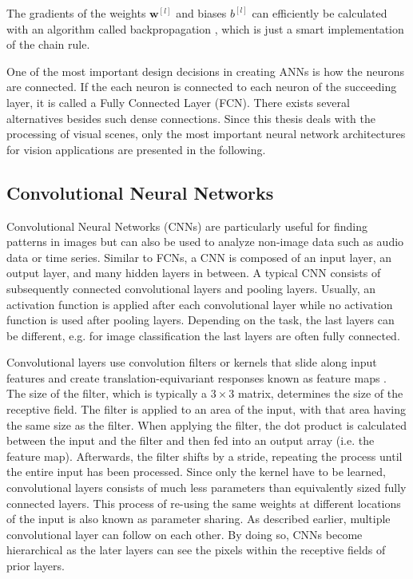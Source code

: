 The gradients of the weights \(\boldsymbol{w}^{[l]}\) and biases \(b^{[l]}\) can efficiently be calculated with an algorithm called backpropagation , which is just a smart implementation of the chain rule.

One of the most important design decisions in creating ANNs is how the neurons are connected.
If the each neuron is connected to each neuron of the succeeding layer, it is called a Fully Connected Layer (FCN). 
There exists several alternatives besides such dense connections.
Since this thesis deals with the processing of visual scenes, only the most important neural network architectures for vision applications are presented in the following.

\subsection{Convolutional Neural Networks}
Convolutional Neural Networks (CNNs) are particularly useful for finding patterns in images but can also be used to analyze non-image data such as audio data or time series.
Similar to FCNs, a CNN is composed of an input layer, an output layer, and many hidden layers in between.
A typical CNN consists of subsequently connected convolutional layers and pooling layers.
Usually, an activation function is applied after each convolutional layer while no activation function is used after pooling layers.
Depending on the task, the last layers can be different, e.g. for image classification the last layers are often fully connected.

Convolutional layers use convolution filters or kernels that slide along input features and create translation-equivariant responses known as feature maps .
The size of the filter, which is typically a \(3\times 3\) matrix, determines the size of the receptive field.
The filter is applied to an area of the input, with that area having the same size as the filter.
When applying the filter, the dot product is calculated between the input and the filter and then fed into an output array (i.e. the feature map).
Afterwards, the filter shifts by a stride, repeating the process until the entire input has been processed.
Since only the kernel have to be learned, convolutional layers consists of much less parameters than equivalently sized fully connected layers.
This process of re-using the same weights at different locations of the input is also known as parameter sharing.
As described earlier, multiple convolutional layer can follow on each other.
By doing so, CNNs become hierarchical as the later layers can see the pixels within the receptive fields of prior layers.


